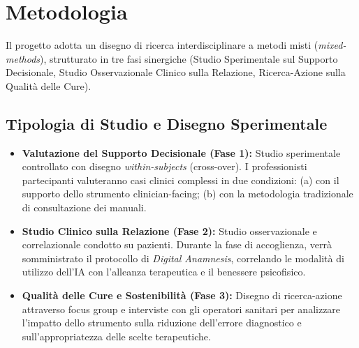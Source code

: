 \documentclass[11pt,a4paper]{article}
\begin{document}
\section{Metodologia}

Il progetto adotta un disegno di ricerca interdisciplinare a metodi misti (\textit{mixed-methods}), strutturato in tre fasi sinergiche (Studio Sperimentale sul Supporto Decisionale, Studio Osservazionale Clinico sulla Relazione, Ricerca-Azione sulla Qualità delle Cure).

\subsection{Tipologia di Studio e Disegno Sperimentale}
\begin{itemize}
    \item \textbf{Valutazione del Supporto Decisionale (Fase 1):} Studio sperimentale controllato con disegno \textit{within-subjects} (cross-over). I professionisti partecipanti valuteranno casi clinici complessi in due condizioni: (a) con il supporto dello strumento clinician-facing; (b) con la metodologia tradizionale di consultazione dei manuali.
    \item \textbf{Studio Clinico sulla Relazione (Fase 2):} Studio osservazionale e correlazionale condotto su pazienti. Durante la fase di accoglienza, verrà somministrato il protocollo di \textit{Digital Anamnesis}, correlando le modalità di utilizzo dell'IA con l'alleanza terapeutica e il benessere psicofisico.
    \item \textbf{Qualità delle Cure e Sostenibilità (Fase 3):} Disegno di ricerca-azione attraverso focus group e interviste con gli operatori sanitari per analizzare l'impatto dello strumento sulla riduzione dell'errore diagnostico e sull'appropriatezza delle scelte terapeutiche.
\end{itemize}
\end{document}
